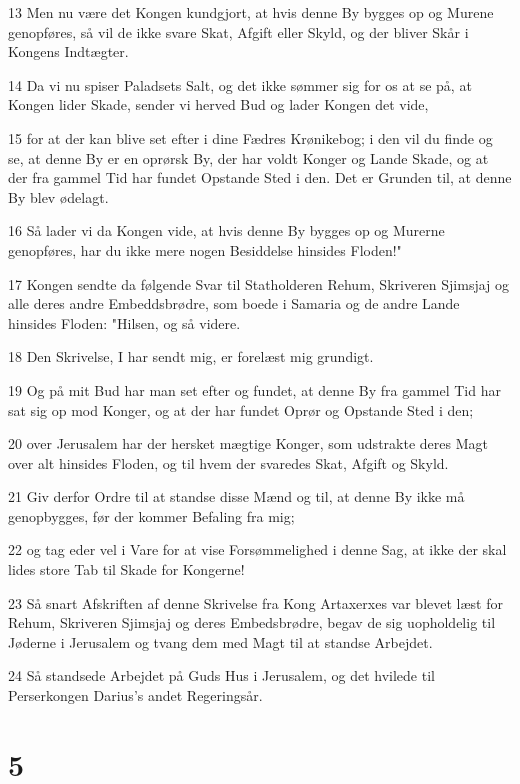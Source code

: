 \par 13 Men nu være det Kongen kundgjort, at hvis denne By bygges op og Murene genopføres, så vil de ikke svare Skat, Afgift eller Skyld, og der bliver Skår i Kongens Indtægter.
\par 14 Da vi nu spiser Paladsets Salt, og det ikke sømmer sig for os at se på, at Kongen lider Skade, sender vi herved Bud og lader Kongen det vide,
\par 15 for at der kan blive set efter i dine Fædres Krønikebog; i den vil du finde og se, at denne By er en oprørsk By, der har voldt Konger og Lande Skade, og at der fra gammel Tid har fundet Opstande Sted i den. Det er Grunden til, at denne By blev ødelagt.
\par 16 Så lader vi da Kongen vide, at hvis denne By bygges op og Murerne genopføres, har du ikke mere nogen Besiddelse hinsides Floden!"
\par 17 Kongen sendte da følgende Svar til Statholderen Rehum, Skriveren Sjimsjaj og alle deres andre Embeddsbrødre, som boede i Samaria og de andre Lande hinsides Floden: "Hilsen, og så videre.
\par 18 Den Skrivelse, I har sendt mig, er forelæst mig grundigt.
\par 19 Og på mit Bud har man set efter og fundet, at denne By fra gammel Tid har sat sig op mod Konger, og at der har fundet Oprør og Opstande Sted i den;
\par 20 over Jerusalem har der hersket mægtige Konger, som udstrakte deres Magt over alt hinsides Floden, og til hvem der svaredes Skat, Afgift og Skyld.
\par 21 Giv derfor Ordre til at standse disse Mænd og til, at denne By ikke må genopbygges, før der kommer Befaling fra mig;
\par 22 og tag eder vel i Vare for at vise Forsømmelighed i denne Sag, at ikke der skal lides store Tab til Skade for Kongerne!
\par 23 Så snart Afskriften af denne Skrivelse fra Kong Artaxerxes var blevet læst for Rehum, Skriveren Sjimsjaj og deres Embedsbrødre, begav de sig uopholdelig til Jøderne i Jerusalem og tvang dem med Magt til at standse Arbejdet.
\par 24 Så standsede Arbejdet på Guds Hus i Jerusalem, og det hvilede til Perserkongen Darius's andet Regeringsår.

\chapter{5}

